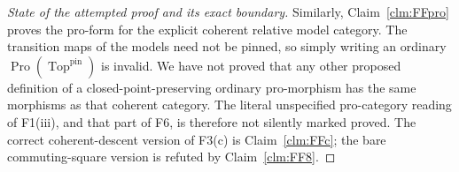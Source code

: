 \begin{proof}[State of the attempted proof and its exact boundary]
Similarly, Claim~\ref{clm:FFpro} proves the pro-form for the
explicit coherent relative model category. The transition maps
of the models need not be pinned, so simply writing an ordinary
\(\operatorname{Pro}(\operatorname{Top}^{\mathrm{pin}})\)
is invalid. We have not proved that any other proposed definition
of a closed-point-preserving ordinary pro-morphism has the same
morphisms as that coherent category. The literal unspecified
pro-category reading of F1(iii), and that part of F6, is therefore
not silently marked proved. The correct coherent-descent version
of F3(c) is Claim~\ref{clm:FFc}; the bare commuting-square
version is refuted by Claim~\ref{clm:FF8}.
\end{proof}
